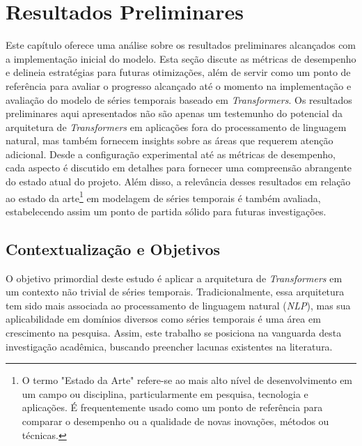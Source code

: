 \chapter{Resultados Preliminares}\label{Cap_resultados-preliminares}
Este capítulo oferece uma análise sobre os resultados preliminares alcançados com a implementação inicial do modelo. Esta seção discute as métricas de desempenho e delineia estratégias para futuras otimizações, além de servir como um ponto de referência para avaliar o progresso alcançado até o momento na implementação e avaliação do modelo de séries temporais baseado em \textit{Transformers}. Os resultados preliminares aqui apresentados não são apenas um testemunho do potencial da arquitetura de \textit{Transformers} em aplicações fora do processamento de linguagem natural, mas também fornecem insights sobre as áreas que requerem atenção adicional. Desde a configuração experimental até as métricas de desempenho, cada aspecto é discutido em detalhes para fornecer uma compreensão abrangente do estado atual do projeto. Além disso, a relevância desses resultados em relação ao estado da arte\footnote{O termo "Estado da Arte" refere-se ao mais alto nível de desenvolvimento em um campo ou disciplina, particularmente em pesquisa, tecnologia e aplicações. É frequentemente usado como um ponto de referência para comparar o desempenho ou a qualidade de novas inovações, métodos ou técnicas.} em modelagem de séries temporais é também avaliada, estabelecendo assim um ponto de partida sólido para futuras investigações.

\section{Contextualização e Objetivos}
O objetivo primordial deste estudo é aplicar a arquitetura de \textit{Transformers} em um contexto não trivial de séries temporais. Tradicionalmente, essa arquitetura tem sido mais associada ao processamento de linguagem natural (\textit{NLP}), mas sua aplicabilidade em domínios diversos como séries temporais é uma área em crescimento na pesquisa. Assim, este trabalho se posiciona na vanguarda desta investigação acadêmica, buscando preencher lacunas existentes na literatura.

